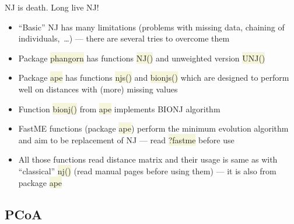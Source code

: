 \documentclass[compress, xelatex, 11pt, xcolor=svgnames, aspectratio=169,
	hyperref={
		bookmarks=true,
		unicode=true,
		colorlinks=true,
		pdftitle={Molecular data in R},
		plainpages=false,
		pdfauthor={Vojtech Zeisek},
		pdfsubject={Course about phylogeny and evolution in R},
		pdfcreator={XeLaTeX},
		pdfkeywords={R, evolution, phylogeny, molecular data},
		linkcolor=Crimson, %
		anchorcolor=Magenta, %
		citecolor=Magenta, %
		filecolor=Magenta, %
		menucolor=Magenta, %
		urlcolor=DodgerBlue, %
		},
	url={hyphens, lowtilde} %
	]{beamer}
\renewcommand{\texttt}[1]{\colorbox{Beige}{{\ttfamily #1}}}
\begin{document}
\begin{frame}{NJ is death. Long live NJ!}
	\label{NJ-replacement}
	\begin{itemize}
		\item \enquote{Basic} NJ has many limitations (problems with missing data, chaining of individuals,~\ldots) --- there are several tries to overcome them
		\item Package \texttt{phangorn} has functions \texttt{NJ()} and unweighted version \texttt{UNJ()}
		\item Package \texttt{ape} has functions \texttt{njs()} and \texttt{bionjs()} which are designed to perform well on distances with (more) missing values
		\item Function \texttt{bionj()} from \texttt{ape} implements BIONJ algorithm
		\item FastME functions (package \texttt{ape}) perform the minimum evolution algorithm and aim to be replacement of NJ --- read \texttt{?fastme} before use
		\item All those functions read distance matrix and their usage is same as with \enquote{classical} \texttt{nj()} (read manual pages before using them) --- it is also from package \texttt{ape}
	\end{itemize}
\end{frame}

\subsection{PCoA}
\end{document}
